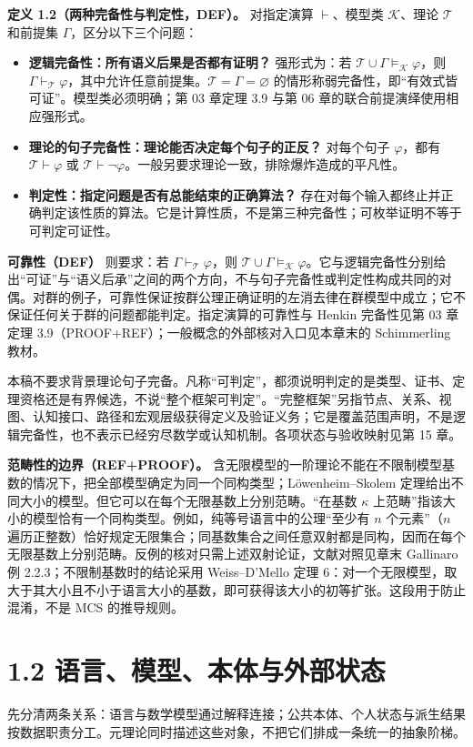 \documentclass[UTF8,a4paper,zihao=-4,fontset=windows,openany]{ctexbook}
\begin{document}
\textbf{定义 1.2（两种完备性与判定性，DEF）。} 对指定演算 \(\vdash\)、模型类 \(\mathcal K\)、理论 \(\mathcal T\) 和前提集 \(\Gamma\)，区分以下三个问题：

\begin{itemize}
\item \textbf{逻辑完备性：所有语义后果是否都有证明？} 强形式为：若 \(\mathcal T\cup\Gamma\models_{\mathcal K}\varphi\)，则 \(\Gamma\vdash_{\mathcal T}\varphi\)，其中允许任意前提集。\(\mathcal T=\Gamma=\varnothing\) 的情形称弱完备性，即“有效式皆可证”。模型类必须明确；第 03 章定理 3.9 与第 06 章的联合前提演绎使用相应强形式。
\item \textbf{理论的句子完备性：理论能否决定每个句子的正反？} 对每个句子 \(\varphi\)，都有 \(\mathcal T\vdash\varphi\) 或 \(\mathcal T\vdash\neg\varphi\)。一般另要求理论一致，排除爆炸造成的平凡性。
\item \textbf{判定性：指定问题是否有总能结束的正确算法？} 存在对每个输入都终止并正确判定该性质的算法。它是计算性质，不是第三种完备性；可枚举证明不等于可判定可证性。
\end{itemize}
\textbf{可靠性（DEF）} 则要求：若 \(\Gamma\vdash_{\mathcal T}\varphi\)，则 \(\mathcal T\cup\Gamma\models_{\mathcal K}\varphi\)。它与逻辑完备性分别给出“可证”与“语义后承”之间的两个方向，不与句子完备性或判定性构成共同的对偶。对群的例子，可靠性保证按群公理正确证明的左消去律在群模型中成立；它不保证任何关于群的问题都能判定。指定演算的可靠性与 Henkin 完备性见第 03 章定理 3.9（PROOF+REF）；一般概念的外部核对入口见本章末的 Schimmerling 教材。

本稿不要求背景理论句子完备。凡称“可判定”，都须说明判定的是类型、证书、定理资格还是有界候选，不说“整个框架可判定”。“完整框架”另指节点、关系、视图、认知接口、路径和宏观层级获得定义及验证义务；它是覆盖范围声明，不是逻辑完备性，也不表示已经穷尽数学或认知机制。各项状态与验收映射见第 15 章。

\textbf{范畴性的边界（REF+PROOF）。} 含无限模型的一阶理论不能在不限制模型基数的情况下，把全部模型确定为同一个同构类型；Löwenheim–Skolem 定理给出不同大小的模型。但它可以在每个无限基数上分别范畴。“在基数 \(\kappa\) 上范畴”指该大小的模型恰有一个同构类型。例如，纯等号语言中的公理“至少有 \(n\) 个元素”（\(n\) 遍历正整数）恰好规定无限集合；同基数集合之间任意双射都是同构，因而在每个无限基数上分别范畴。反例的核对只需上述双射论证，文献对照见章末 Gallinaro 例 2.2.3；不限制基数时的结论采用 Weiss–D’Mello 定理 6：对一个无限模型，取大于其大小且不小于语言大小的基数，即可获得该大小的初等扩张。这段用于防止混淆，不是 MCS 的推导规则。

\section{1.2 语言、模型、本体与外部状态}
先分清两条关系：语言与数学模型通过解释连接；公共本体、个人状态与派生结果按数据职责分工。元理论同时描述这些对象，不把它们排成一条统一的抽象阶梯。
\end{document}
